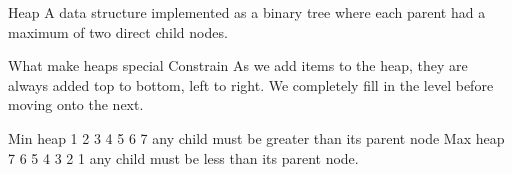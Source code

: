 Heap 
  A data structure implemented as a binary tree 
  where each parent had a maximum of two direct child nodes.

  What make heaps special 
    Constrain
      As we add items to the heap, they are always added top to bottom, left to right.
       We completely fill in the level before moving onto the next. 

    Min heap 
        1
     2     3
    4 5   6 7 
any child must be greater than its parent node
  Max heap 
       7 
    6    5 
  4  3  2  1 
any child must be less than its parent node. 